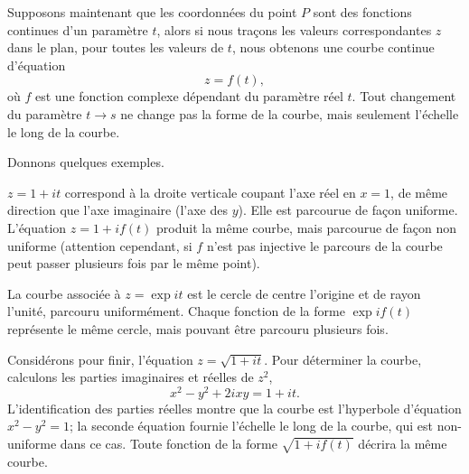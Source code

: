 Supposons maintenant que les coordonnées du point $P$ sont des fonctions continues d'un paramètre $t$, alors si nous traçons les valeurs correspondantes $z$ dans le plan, pour toutes les valeurs de $t$, nous obtenons une courbe continue d'équation
$$z=f(t),$$
où $f$ est une fonction complexe dépendant du paramètre réel $t$. Tout changement du paramètre $t \rightarrow s$ ne change pas la forme de la courbe, mais seulement l'échelle le long de la courbe. 

Donnons quelques exemples. 
\begin{MYenumerate}
\item $z=1+i t$ correspond à la droite verticale coupant l'axe réel en $x=1$, de même direction que l'axe imaginaire (l'axe des $y$). Elle est parcourue de façon uniforme. L'équation $z=1+i f(t)$ produit la même courbe, mais parcourue de façon non uniforme (attention cependant, si $f$ n'est pas injective le parcours de la courbe peut passer plusieurs fois par le même point).
\item La courbe associée à $z=\exp{i t}$ est le cercle de centre l'origine et de rayon l'unité, parcouru uniformément. Chaque fonction de la forme $\exp{i f(t)}$ représente le même cercle, mais pouvant être parcouru plusieurs fois.  
\item Considérons pour finir, l'équation $z=\sqrt{1+ i t}$. Pour déterminer la courbe, calculons les parties imaginaires et réelles de $z^2$,
$$x^2-y^2 + 2 i xy=1+i t.$$
L'identification des parties réelles montre que la courbe est l'hyperbole d'équation $x^2-y^2=1$; la seconde équation fournie l'échelle le long de la courbe, qui est non-uniforme dans ce cas. Toute fonction de la forme $\sqrt{1+i f(t)}$ décrira la même courbe. 
\end{MYenumerate}

